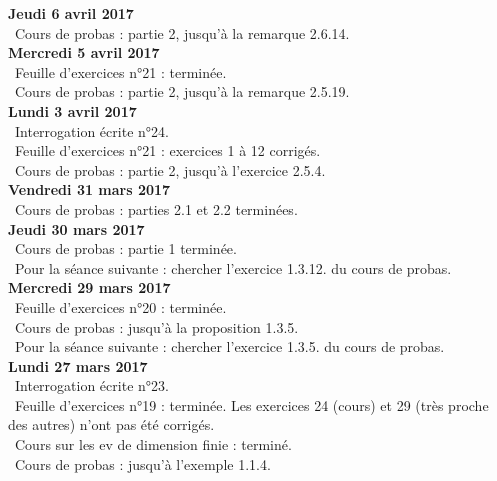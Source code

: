 \documentclass[12pt,a4paper]{article}
\begin{document}
\noindent\textbf{Jeudi 6 avril 2017}\\
\bu\ Cours de probas : partie 2, jusqu'à la remarque 2.6.14.\vspace{.4cm}\\

\noindent\textbf{Mercredi 5 avril 2017}\\
\bu\ Feuille d'exercices n°21 : terminée.\\
\bu\ Cours de probas : partie 2, jusqu'à la remarque 2.5.19.\vspace{.4cm}\\

\noindent\textbf{Lundi 3 avril 2017}\\
\bu\ Interrogation écrite n°24.\\
\bu\ Feuille d'exercices n°21 : exercices 1 à 12 corrigés.\\
\bu\ Cours de probas : partie 2, jusqu'à l'exercice 2.5.4.\vspace{.4cm}\\

\noindent\textbf{Vendredi 31 mars 2017}\\
\bu\ Cours de probas : parties 2.1 et 2.2 terminées.\vspace{.4cm}\\

\noindent\textbf{Jeudi 30 mars 2017}\\
\bu\ Cours de probas : partie 1 terminée.\\
\bu\ Pour la séance suivante : chercher l'exercice 1.3.12. du cours de probas.\vspace{.4cm}\\

\noindent\textbf{Mercredi 29 mars 2017}\\
\bu\ Feuille d'exercices n°20 : terminée.\\
\bu\ Cours de probas : jusqu'à la proposition 1.3.5.\\
\bu\ Pour la séance suivante : chercher l'exercice 1.3.5. du cours de probas.\vspace{.4cm}\\

\noindent\textbf{Lundi 27 mars 2017}\\
\bu\ Interrogation écrite n°23.\\
\bu\ Feuille d'exercices n°19 : terminée. Les exercices 24 (cours) et 29 (très proche des autres) n'ont pas été corrigés.\\
\bu\ Cours sur les ev de dimension finie : terminé.\\
\bu\ Cours de probas : jusqu'à l'exemple 1.1.4.\vspace{.4cm}\\
\end{document}
